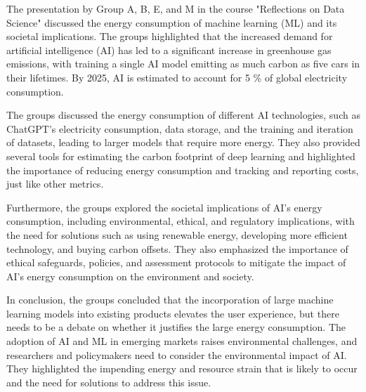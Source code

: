 \documentclass[fleqn,12pt]{article}
\begin{document}
The presentation by Group A, B, E, and M in the course "Reflections on Data Science" discussed the energy consumption of machine learning (ML) 
and its societal implications. The groups highlighted that the increased demand for artificial intelligence (AI) has led to a significant 
increase in greenhouse gas emissions, with training a single AI model emitting as much carbon as five cars in their lifetimes. 
By 2025, AI is estimated to account for 5 \% of global electricity consumption.

The groups discussed the energy consumption of different AI technologies, such as ChatGPT's electricity consumption, data storage, 
and the training and iteration of datasets, leading to larger models that require more energy. 
They also provided several tools for estimating the carbon footprint of deep learning and highlighted the importance of reducing energy 
consumption and tracking and reporting costs, just like other metrics.

Furthermore, the groups explored the societal implications of AI's energy consumption, including environmental, ethical, and 
regulatory implications, with the need for solutions such as using renewable energy, developing more efficient technology, and buying carbon offsets. 
They also emphasized the importance of ethical safeguards, policies, and assessment protocols to mitigate the impact of AI's energy consumption on the environment and society.

In conclusion, the groups concluded that the incorporation of large machine learning models into existing products elevates the user experience, 
but there needs to be a debate on whether it justifies the large energy consumption. 
The adoption of AI and ML in emerging markets raises environmental challenges, and researchers and policymakers need to consider the environmental 
impact of AI. They highlighted the impending energy and resource strain that is likely to occur and the need for solutions to address this issue.
\end{document}
